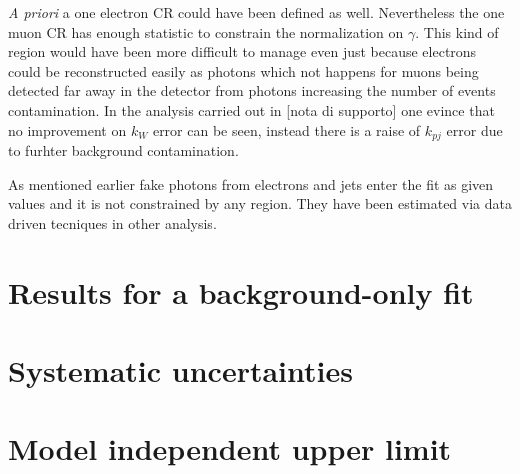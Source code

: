 {\itshape A priori} a one electron CR could have been defined as well. Nevertheless the one muon CR has enough statistic to constrain the normalization on \Wboson$\gamma$.  This kind of region would have been more difficult to manage even just because electrons could be reconstructed easily as photons which not happens for muons being detected far away in the detector from photons increasing the number of \gj events contamination. In the analysis carried out in [nota di supporto] one evince that no improvement on $k_W$ error can be seen, instead there is a raise of $k_{pj}$ error due to furhter background contamination.

As mentioned earlier fake photons from electrons and jets enter the fit as given values and it is not constrained by any region. They have been estimated via data driven tecniques in other analysis.

\section{Results for a background-only fit}
\lipsum[2]

\section{Systematic uncertainties}
\lipsum[3]
        
\section{Model independent upper limit}
\lipsum[4]
